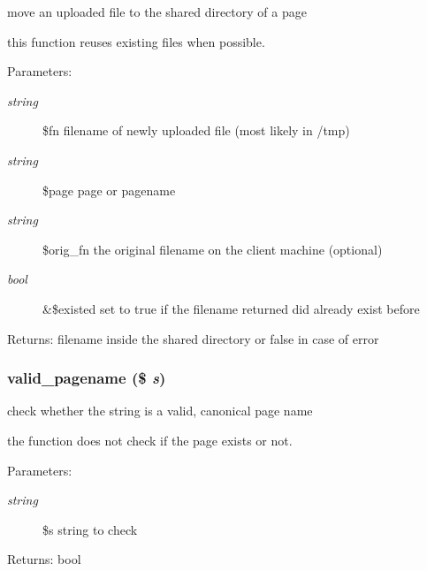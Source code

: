move an uploaded file to the shared directory of a page

this function reuses existing files when possible. \begin{Desc}
\item[Parameters:]
\begin{description}
\item[{\em string}]\$fn filename of newly uploaded file (most likely in /tmp) \item[{\em string}]\$page page or pagename \item[{\em string}]\$orig\_\-fn the original filename on the client machine (optional) \item[{\em bool}]\&\$existed set to true if the filename returned did already exist before \end{description}
\end{Desc}
\begin{Desc}
\item[Returns:]filename inside the shared directory or false in case of error \end{Desc}
\hypertarget{common_8inc_8php_0ef613d233a6e62f7e631b8dfcd710bf}{
\subsubsection[{valid\_\-pagename}]{\setlength{\rightskip}{0pt plus 5cm}valid\_\-pagename (\$ {\em s})}}
\label{common_8inc_8php_0ef613d233a6e62f7e631b8dfcd710bf}


check whether the string is a valid, canonical page name

the function does not check if the page exists or not. \begin{Desc}
\item[Parameters:]
\begin{description}
\item[{\em string}]\$s string to check \end{description}
\end{Desc}
\begin{Desc}
\item[Returns:]bool \end{Desc}
